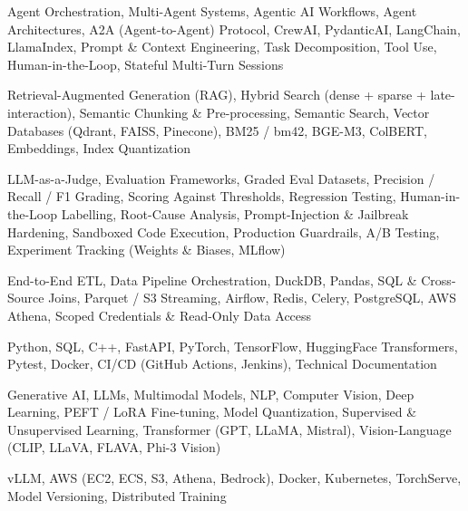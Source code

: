 \documentclass[letter,10pt]{article}
\begin{document}
 Agent Orchestration, Multi-Agent Systems, Agentic AI Workflows, Agent Architectures, A2A (Agent-to-Agent) Protocol, CrewAI, PydanticAI, LangChain, LlamaIndex, Prompt \& Context Engineering, Task Decomposition, Tool Use, Human-in-the-Loop, Stateful Multi-Turn Sessions\par\vspace{2pt}

 Retrieval-Augmented Generation (RAG), Hybrid Search (dense + sparse + late-interaction), Semantic Chunking \& Pre-processing, Semantic Search, Vector Databases (Qdrant, FAISS, Pinecone), BM25 / bm42, BGE-M3, ColBERT, Embeddings, Index Quantization\par\vspace{2pt}

 LLM-as-a-Judge, Evaluation Frameworks, Graded Eval Datasets, Precision / Recall / F1 Grading, Scoring Against Thresholds, Regression Testing, Human-in-the-Loop Labelling, Root-Cause Analysis, Prompt-Injection \& Jailbreak Hardening, Sandboxed Code Execution, Production Guardrails, A/B Testing, Experiment Tracking (Weights \& Biases, MLflow)\par\vspace{2pt}

 End-to-End ETL, Data Pipeline Orchestration, DuckDB, Pandas, SQL \& Cross-Source Joins, Parquet / S3 Streaming, Airflow, Redis, Celery, PostgreSQL, AWS Athena, Scoped Credentials \& Read-Only Data Access\par\vspace{2pt}

 Python, SQL, C++, FastAPI, PyTorch, TensorFlow, HuggingFace Transformers, Pytest, Docker, CI/CD (GitHub Actions, Jenkins), Technical Documentation\par\vspace{2pt}

 Generative AI, LLMs, Multimodal Models, NLP, Computer Vision, Deep Learning, PEFT / LoRA Fine-tuning, Model Quantization, Supervised \& Unsupervised Learning, Transformer (GPT, LLaMA, Mistral), Vision-Language (CLIP, LLaVA, FLAVA, Phi-3 Vision)\par\vspace{2pt}

 vLLM, AWS (EC2, ECS, S3, Athena, Bedrock), Docker, Kubernetes, TorchServe, Model Versioning, Distributed Training
\end{document}

